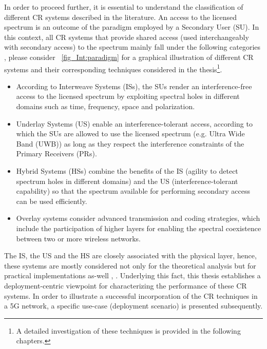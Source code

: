 In order to proceed further, it is essential to understand the classification of different CR systems described in the literature. An access to the licensed spectrum is an outcome of the paradigm employed by a Secondary User (SU). In this context, all CR systems that provide shared access (used interchangeably with secondary access) to the spectrum mainly fall under the following categories \cite{Goldsmith09}, please consider \figurename~\ref{fig_Int:paradigm} for a graphical illustration of different CR systems and their corresponding techniques considered in the thesis\footnote{A detailed investigation of these techniques is provided in the following chapters.}. 
\begin{itemize}
\item According to Interweave Systems (ISs), the SUs render an interference-free access to the licensed spectrum by exploiting spectral holes in different domains such as time, frequency, space and polarization. 
\item Underlay Systems (US) enable an interference-tolerant access, according to which the SUs are allowed to use the licensed spectrum (e.g. Ultra Wide Band (UWB)) as long as they respect the interference constraints of the Primary Receivers (PRs). 
\item Hybrid Systems (HSs) combine the benefits of the IS (agility to detect spectrum holes in different domains) and the US (interference-tolerant capability) so that the spectrum available for performing secondary access can be used efficiently.  
\item Overlay systems consider advanced transmission and coding strategies, which include the participation of higher layers for enabling the spectral coexistence between two or more wireless networks. 
\end{itemize}
The IS, the US and the HS are closely associated with the physical layer, hence, these systems are mostly considered not only for the theoretical analysis but for practical implementations as-well , \cite{Cabric04, Cabric06, Kim10}. 
Underlying this fact, this thesis establishes a deployment-centric viewpoint for characterizing the performance of these CR systems. In order to illustrate a successful incorporation of the CR techniques in a 5G network, a specific use-case (deployment scenario) is presented subsequently. 


